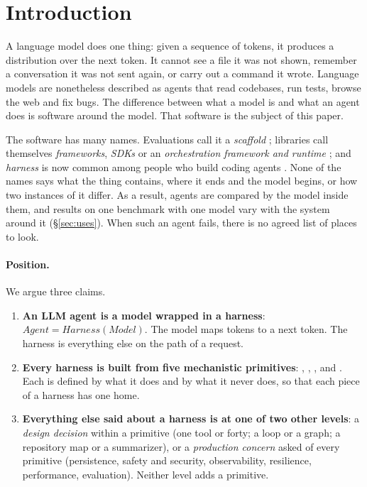 \section{Introduction}
\label{sec:intro}

A language model does one thing: given a sequence of tokens, it produces a distribution over the next token. It cannot see a file it was not shown, remember a conversation it was not sent again, or carry out a command it wrote. Language models are nonetheless described as agents that read codebases, run tests, browse the web and fix bugs. The difference between what a model is and what an agent does is software around the model. That software is the subject of this paper.

The software has many names. Evaluations call it a \emph{scaffold} \citep{anthropic2025swebench,metr2025update}; libraries call themselves \emph{frameworks}, \emph{SDKs} or an \emph{orchestration framework and runtime} \citep{langgraph}; and \emph{harness} is now common among people who build coding agents \citep{anthropic2025harnesses}. None of the names says what the thing contains, where it ends and the model begins, or how two instances of it differ. As a result, agents are compared by the model inside them, and results on one benchmark with one model vary with the system around it (\S\ref{sec:uses}). When such an agent fails, there is no agreed list of places to look.

\paragraph{Position.} We argue three claims.
\begin{enumerate}
  \item \textbf{An LLM agent is a model wrapped in a harness}: $\textit{Agent} = \textit{Harness}(\textit{Model})$. The model maps tokens to a next token. The harness is everything else on the path of a request.
  \item \textbf{Every harness is built from five mechanistic primitives}: , , ,  and . Each is defined by what it does and by what it never does, so that each piece of a harness has one home.
  \item \textbf{Everything else said about a harness is at one of two other levels}: a \emph{design decision} within a primitive (one tool or forty; a loop or a graph; a repository map or a summarizer), or a \emph{production concern} asked of every primitive (persistence, safety and security, observability, resilience, performance, evaluation). Neither level adds a primitive.
\end{enumerate}

